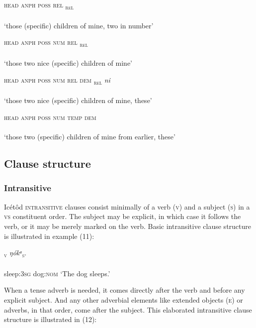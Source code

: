 \textsc{head anph poss rel}
\ea\label{ex:}
\textsc{\textsubscript{rel}}  \\
    \\
\glt ‘those (specific) children of mine, two in number’ 
\z




\textsc{head anph poss num rel}
\ea\label{ex:}
\textsc{\textsubscript{ rel}} \\
    \\
\glt ‘those two nice (specific) children of mine’ 
\z




\textsc{head anph poss num rel dem}
\ea\label{ex:}
\textsc{\textsubscript{ rel}}\textit{ ni} \\
    \\
\glt ‘those two nice (specific) children of mine, these’ 
\z




\textsc{head anph poss num temp dem}
\ea\label{ex:}
 \\
    \\
\glt ‘those two (specific) children of mine from earlier, these’ 
\z






\subsection{Clause structure}
\subsubsection{Intransitive}

Icétôd \textsc{intransitive} clauses consist minimally of a verb (\textsc{v}) and a subject (\textsc{s}) in a \textsc{vs} constituent order. The subject may be explicit, in which case it follows the verb, or it may be merely marked on the verb. Basic intransitive clause structure is illustrated in example (11):




\ea\label{ex:}
\textsc{\textsubscript{v}}\textsc{}    \textit{ŋókᵃ}\textsc{\textsubscript{s}}. \\
    \\
sleep:\textsc{3sg}   dog:\textsc{nom}
\glt ‘The dog sleeps.’ 
\z


When a tense adverb is needed, it comes directly after the verb and before any explicit subject. And any other adverbial elements like extended objects (\textsc{e}) or adverbs, in that order, come after the subject. This elaborated intransitive clause structure is illustrated in (12):




